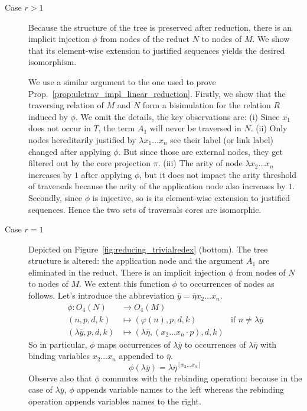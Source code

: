 \documentclass{article}
\theoremstyle{definition}
\def\coresymbol{\pi} %
\begin{document}
    \begin{description}
    \item[Case $r>1$] Because the structure of the tree is preserved after reduction, there is an implicit injection $\phi$ from nodes of the reduct $N$ to nodes of $M$. We show that its element-wise extension to justified sequences yields the desired isomorphism.

    We use a similar argument to the one used to prove Prop.~\ref{prop:ulctrav_impl_linear_reduction}. Firstly, we show that the traversing relation of $M$ and $N$ form a bisimulation for the relation $R$ induced by $\phi$. We omit the details, the key observations are:
    (i) Since $x_1$ does not occur in $T$, the term $A_1$ will never be traversed in $N$.
    (ii) Only nodes hereditarily justified by $\lambda x_1 \ldots x_n$ see their label (or link label) changed after applying $\phi$. But since those are external nodes, they get filtered out by the core projection $\coresymbol$.
    (iii) The arity of node $\lambda x_2 \ldots x_n$ increases by $1$ after applying $\phi$, but it does not impact the arity threshold of traversals because the arity of the application node also increases by $1$.
    Secondly, since $\phi$ is injective, so is its element-wise extension to justified sequences. Hence the two sets of traversals cores are isomorphic.

    \item[Case $r=1$] Depicted on Figure~\ref{fig:reducing_trivialredex} (bottom). The tree structure is altered: the application node and the argument $A_1$ are eliminated in the reduct. There is an implicit injection $\phi$ from nodes of $N$ to nodes of $M$. We extent this function $\phi$ to occurrences of nodes as follows. Let's introduce the abbreviation $\overline{y} = \overline\eta x_2 \ldots x_n$.
    \begin{align*}
        \phi\colon O_4(N) &\rightarrow O_4(M) \\
        (n,p,d,k) &\longmapsto (\varphi(n),p,d,k) & \mbox{if $n\neq\lambda\overline{y}$} \\
        (\lambda\overline{y},p,d,k) &\longmapsto (\lambda\overline\eta,(x_2 \ldots x_n \cdot p),d,k)
    \end{align*}
    So in particular, $\phi$ maps occurrences of $\lambda\overline{y}$ to occurrences of $\lambda\overline\eta$ with binding variables $x_2 \ldots x_n$ appended to $\overline\eta$.
    \begin{equation}
        \phi(\lambda\overline{y})
        =
        \lambda\overline\eta^{[x_2\ldots x_n]}
        \label{eqn:phi_maps_lambday_to_lambdaeta}
    \end{equation}
    Observe also that $\phi$ commutes with the rebinding operation: because in the case of $\lambda\overline{y}$, $\phi$ appends variable names to the left whereas the rebinding operation appends variables names to the right.


\end{description}
\end{document}

